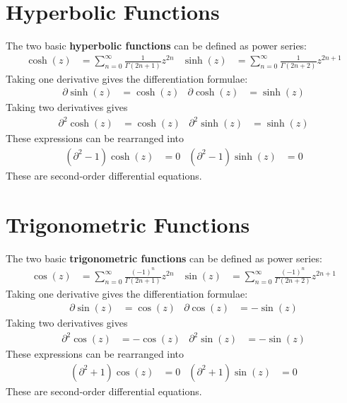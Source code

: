 \section{Hyperbolic Functions}
The two basic \textbf{hyperbolic functions} can be defined as power series:
\begin{align}
    \cosh(z) &= \sum_{n = 0}^{\infty} \frac{1}{\Gamma(2n + 1)} z^{2n} & \sinh(z) &= \sum_{n = 0}^{\infty} \frac{1}{\Gamma(2n + 2)} z^{2n + 1}
\end{align}
Taking one derivative gives the differentiation formulae:
\begin{align}
    \partial \sinh(z) &= \cosh(z) & \partial \cosh(z) &= \sinh(z)
\end{align}
Taking two derivatives gives
\begin{align}
    \partial^{2} \cosh(z) &= \cosh(z) & \partial^{2} \sinh(z) &= \sinh(z)
\end{align}
These expressions can be rearranged into
\begin{align}
    \left( \partial^{2} - 1 \right) \cosh(z) &= 0 & \left( \partial^{2} - 1 \right) \sinh(z) &= 0
\end{align}
These are second-order differential equations.
\section{Trigonometric Functions}
The two basic \textbf{trigonometric functions} can be defined as power series:
\begin{align}
    \cos(z) &= \sum_{n = 0}^{\infty} \frac{(-1)^{n}}{\Gamma(2n + 1)} z^{2n} & \sin(z) &= \sum_{n = 0}^{\infty} \frac{(-1)^{n}}{\Gamma(2n + 2)} z^{2n + 1}
\end{align}
Taking one derivative gives the differentiation formulae:
\begin{align}
    \partial \sin(z) &= \cos(z) & \partial \cos(z) &= -\sin(z)
\end{align}
Taking two derivatives gives
\begin{align}
    \partial^{2} \cos(z) &= -\cos(z) & \partial^{2} \sin(z) &= -\sin(z)
\end{align}
These expressions can be rearranged into
\begin{align}
    \left( \partial^{2} + 1 \right) \cos(z) &= 0 & \left( \partial^{2} + 1 \right) \sin(z) &= 0
\end{align}
These are second-order differential equations.
